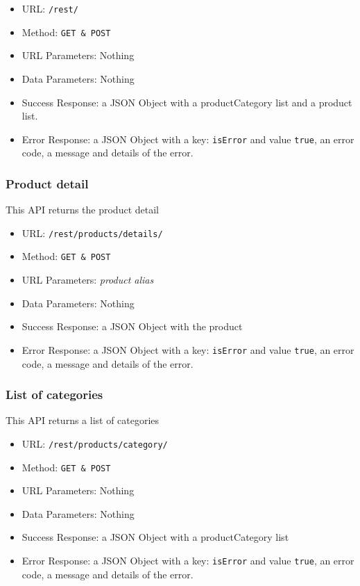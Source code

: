 \begin{itemize}
    \item URL: \texttt{/rest/}
    \item Method: \texttt{GET \& POST}
    \item URL Parameters: Nothing
    \item Data Parameters: Nothing
    \item Success Response: a JSON Object with a productCategory list and a product list.
    \item Error Response: a JSON Object with a key: \texttt{isError}  and value \texttt{true}, an error code, a message and details of the error.

\end{itemize}

\subsubsection*{Product detail}

This API returns the product detail

\begin{itemize}
    \item URL: \texttt{/rest/products/details/}
    \item Method: \texttt{GET \& POST}
    \item URL Parameters: \textit{product alias}
    \item Data Parameters: Nothing
    \item Success Response: a JSON Object with the product
    \item Error Response: a JSON Object with a key: \texttt{isError}  and value \texttt{true}, an error code, a message and details of the error.
\end{itemize}

\subsubsection*{List of categories}

This API returns a list of categories

\begin{itemize}
    \item URL: \texttt{/rest/products/category/}
    \item Method: \texttt{GET \& POST}
    \item URL Parameters: Nothing
    \item Data Parameters: Nothing
    \item Success Response: a JSON Object with a productCategory list
    \item Error Response: a JSON Object with a key: \texttt{isError}  and value \texttt{true}, an error code, a message and details of the error.

\end{itemize}

